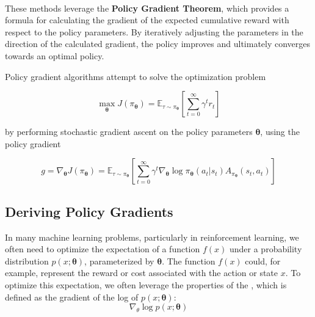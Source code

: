 \





These methods leverage the \textbf{Policy Gradient Theorem}, which provides a formula for calculating the gradient of the expected cumulative reward with respect to the policy parameters. By iteratively adjusting the parameters in the direction of the calculated gradient, the policy improves and ultimately converges towards an optimal policy.

Policy gradient algorithms attempt to solve the optimization problem 

\begin{equation}
\max_{\boldsymbol{\theta}} J(\pi_{\boldsymbol{\theta}}) = \mathbb{E}_{\tau \sim \pi_{\boldsymbol{\theta}}} \left[\sum_{t=0}^{\infty} \gamma^{t} r_t\right]
\end{equation}

by performing stochastic gradient ascent on the policy parameters $\boldsymbol{\theta}$, using the policy gradient 

\begin{equation}
g = \nabla_{\boldsymbol{\theta}} J(\pi_{\boldsymbol{\theta}}) = \mathbb{E}_{\tau \sim \pi_{\boldsymbol{\theta}}} \left[\sum_{t=0}^{\infty} \gamma^{t} \nabla_{\boldsymbol{\theta}} \log \pi_{\boldsymbol{\theta}}(a_t|s_t) A_{\pi_{\boldsymbol{\theta}}}(s_t, a_t)\right]
\end{equation}



\subsection{Deriving Policy Gradients}
In many machine learning problems, particularly in reinforcement learning, we often need to optimize the expectation of a function $f(x)$ under a probability distribution $p(x; \boldsymbol{\theta})$, parameterized by $\boldsymbol{\theta}$. The function $f(x)$ could, for example, represent the reward or cost associated with the action or state $x$. To optimize this expectation, we often leverage the properties of the , which is defined as the gradient of the log of $p(x; \boldsymbol{\theta})$:
$$
\nabla_{\theta} \log p(x; \boldsymbol{\theta})
$$

